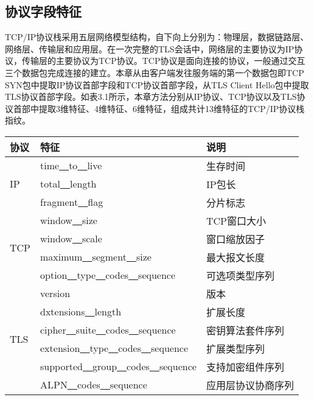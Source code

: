 \subsection{协议字段特征}

TCP/IP协议栈采用五层网络模型结构，自下向上分别为：物理层，数据链路层、网络层、传输层和应用层。在一次完整的TLS会话中，网络层的主要协议为IP协议，传输层的主要协议为TCP协议。TCP协议是面向连接的协议，一般通过交互三个数据包完成连接的建立。本章从由客户端发往服务端的第一个数据包即TCP SYN包中提取IP协议首部字段和TCP协议首部字段，从TLS Client Hello包中提取TLS协议首部字段。如表3.1所示，本章方法分别从IP协议、TCP协议以及TLS协议首部中提取3维特征、4维特征、6维特征，组成共计13维特征的TCP/IP协议栈指纹。

\begin{table}[!htbp] 
    \centering
    \footnotesize
    \setlength{\tabcolsep}{20pt}
    \renewcommand{\arraystretch}{1}
\begin{tabular}{lll}
\toprule
协议 & 特征 & 说明 \\ \hline
\multirow{3}{*}{IP} & time\underline{~~}to\underline{~~}live & 生存时间 \\ 
& total\underline{~~}length & IP包长\\ 
& fragment\underline{~~}flag & 分片标志\\ \hline
\multirow{4}{*}{TCP} & window\underline{~~}size & TCP窗口大小 \\ 
 & window\underline{~~}scale & 窗口缩放因子 \\ 
 & maximum\underline{~~}segment\underline{~~}size & 最大报文长度 \\ 
 & option\underline{~~}type\underline{~~}codes\underline{~~}sequence & 可选项类型序列 \\ \hline
\multirow{6}{*}{TLS} & version & 版本 \\ 
 & dxtensions\underline{~~}length & 扩展长度 \\ 
 & cipher\underline{~~}suite\underline{~~}codes\underline{~~}sequence & 密钥算法套件序列 \\ 
 & extension\underline{~~}type\underline{~~}codes\underline{~~}sequence & 扩展类型序列 \\ 
 & supported\underline{~~}group\underline{~~}codes\underline{~~}sequence & 支持加密组件序列 \\ 
 & ALPN\underline{~~}codes\underline{~~}sequence & 应用层协议协商序列 \\ 
\bottomrule
\end{tabular}
\end{table}

